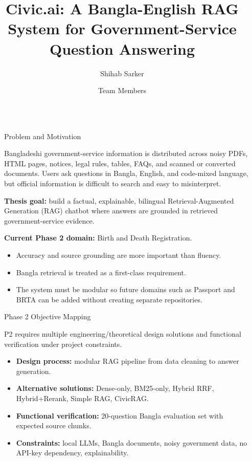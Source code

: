 \documentclass[final]{beamer}
\title{Civic.ai: A Bangla-English RAG System for Government-Service Question Answering}
\author{Shihab Sarker \and Team Members}
\institute[shortinst]{Department of Computer Science and Engineering \\ Final Year Thesis - Phase 2 Design and Evaluation}
\newlength{\sepwidth}
\newlength{\colwidth}
\newcommand{\separatorcolumn}{\begin{column}{\sepwidth}\end{column}}
\begin{document}
\begin{frame}[t]
\begin{columns}[t]
\separatorcolumn


\begin{column}{\colwidth}

  \begin{block}{Problem and Motivation}

    Bangladeshi government-service information is distributed across noisy
    PDFs, HTML pages, notices, legal rules, tables, FAQs, and scanned or
    converted documents. Users ask questions in Bangla, English, and
    code-mixed language, but official information is difficult to search and
    easy to misinterpret.

    \vspace{0.5em}
    \textbf{Thesis goal:} build a factual, explainable, bilingual
    Retrieval-Augmented Generation (RAG) chatbot where answers are grounded in
    retrieved government-service evidence.

    \vspace{0.5em}
    \textbf{Current Phase 2 domain:} Birth and Death Registration.

    \begin{itemize}
      \item Accuracy and source grounding are more important than fluency.
      \item Bangla retrieval is treated as a first-class requirement.
      \item The system must be modular so future domains such as Passport and
        BRTA can be added without creating separate repositories.
    \end{itemize}

  \end{block}

  \begin{alertblock}{Phase 2 Objective Mapping}

    P2 requires multiple engineering/theoretical design solutions and
    functional verification under project constraints.

    \begin{itemize}
      \item \textbf{Design process:} modular RAG pipeline from data cleaning to
        answer generation.
      \item \textbf{Alternative solutions:} Dense-only, BM25-only, Hybrid RRF,
        Hybrid+Rerank, Simple RAG, CivicRAG.
      \item \textbf{Functional verification:} 20-question Bangla evaluation set
        with expected source chunks.
      \item \textbf{Constraints:} local LLMs, Bangla documents, noisy
        government data, no API-key dependency, explainability.
    \end{itemize}


\end{alertblock}
\end{column}
\end{columns}
\end{frame}
\end{document}
